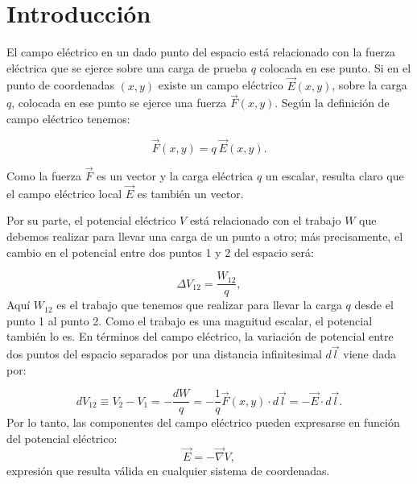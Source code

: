 \documentclass[laboratorio]{guia}
\begin{document}
 
\maketitle

\section{Introducci\'on}

El campo el\'ectrico en un dado punto del espacio est\'a relacionado con la fuerza
el\'ectrica que se ejerce sobre una carga de prueba $q$ colocada en ese punto. Si
en el punto de coordenadas $(x,y)$ existe un campo el\'ectrico $\vec{E}(x,y)$,
sobre la carga $q$, colocada en ese punto se ejerce una fuerza $\vec{F}(x,y)$.
Seg\'un la definici\'on de campo el\'ectrico tenemos:

\begin{equation} 
\vec{F}(x,y) = q \: \vec{E}(x,y).  
\end{equation}

Como la fuerza $\vec{F}$ es un vector y la carga el\'ectrica $q$ un escalar, resulta
claro que el campo el\'ectrico local $\vec{E}$ es tambi\'en
un vector. 

Por su parte, el potencial el\'ectrico $V$ est\'a relacionado con el
trabajo $W$ que debemos realizar para llevar una carga de un punto a otro; m\'as
precisamente, el cambio en el potencial entre dos puntos 1 y 2 del espacio ser\'a: 

\begin{equation}
    \Delta V_{12} = \frac{W_{12}}{q},
\end{equation}
Aqu\'i $W_{12}$ es el trabajo que tenemos que realizar para llevar la
carga $q$ desde el punto 1 al punto 2. Como el trabajo es una magnitud escalar, el
potencial tambi\'en lo es. En t\'erminos del campo el\'ectrico, la variaci\'on de potencial 
entre dos puntos del espacio separados por una distancia infinitesimal $d\vec{l}$ viene dada por:

\begin{equation}
    dV_{12} \equiv V_2 - V_1 = - \frac{dW}{q} = - \frac{1}{q} \vec{F}(x,y)
    \cdot d\vec{l} = - \vec{E} \cdot d\vec{l}.
\end{equation}
Por lo tanto, las componentes del campo el\'ectrico pueden expresarse en funci\'on del potencial el\'ectrico:
\begin{equation}
    \vec{E} = - \vec{\nabla} V,
\end{equation}
expresi\'on que resulta v\'alida en cualquier sistema de coordenadas. 
\end{document}

